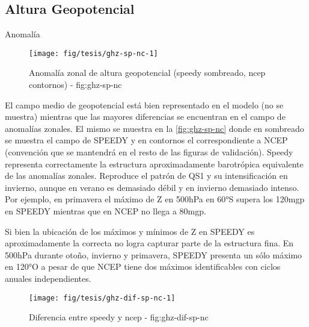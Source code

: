 \documentclass[spanish,a4paper]{book}
\begin{document}
\subsection{Altura Geopotencial}\label{altura-geopotencial-1}

Anomalía

\begin{landscape}\begin{figure}

{\centering \texttt{[image: fig/tesis/ghz-sp-nc-1]} 

}

\caption{Anomalía zonal de altura geopotencial (speedy sombreado, ncep contornos) - fig:ghz-sp-nc}\label{fig:ghz-sp-nc}
\end{figure}
\end{landscape}

El campo medio de geopotencial está bien representado en el modelo (no
se muestra) mientras que las mayores diferencias se encuentran en el
campo de anomalías zonales. El mismo se muestra en la
\autoref{fig:ghz-sp-nc} donde en sombreado se muestra el campo de SPEEDY
y en contornos el correspondiente a NCEP (convención que se mantendrá en
el resto de las figuras de validación). Speedy representa correctamente
la estructura aproximadamente barotrópica equivalente de las anomalías
zonales. Reproduce el patrón de QS1 y su intensificación en invierno,
aunque en verano es demasiado débil y en invierno demasiado intenso. Por
ejemplo, en primavera el máximo de Z en 500hPa en 60°S supera los 120mgp
en SPEEDY mientras que en NCEP no llega a 80mgp.

Si bien la ubicación de los máximos y mínimos de Z en SPEEDY es
aproximadamente la correcta no logra capturar parte de la estructura
fina. En 500hPa durante otoño, invierno y primavera, SPEEDY presenta un
sólo máximo en 120°O a pesar de que NCEP tiene dos máximos
identificables con ciclos anuales independientes.


\begin{landscape}\begin{figure}

{\centering \texttt{[image: fig/tesis/ghz-dif-sp-nc-1]} 

}

\caption{Diferencia entre speedy y ncep - fig:ghz-dif-sp-nc}\label{fig:ghz-dif-sp-nc}
\end{figure}
\end{landscape}
\end{document}
